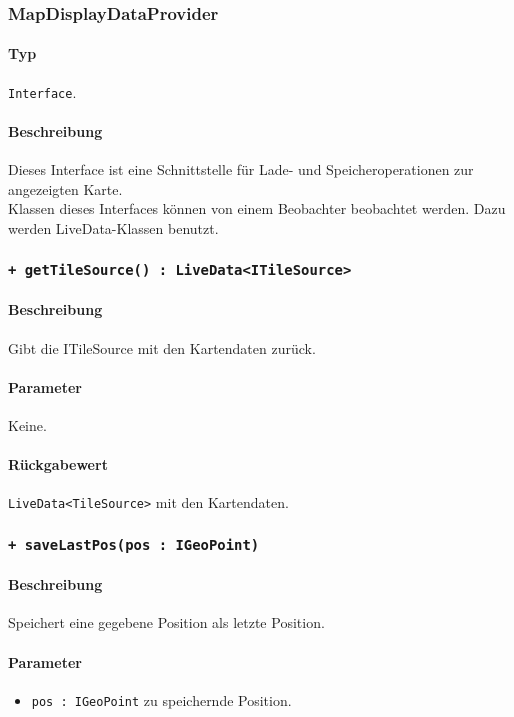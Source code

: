 \subsubsection{MapDisplayDataProvider}\label{App_Map_ViewModel_MapDisplayDataProvider}
\paragraph*{Typ}
\texttt{Interface}.
\paragraph*{Beschreibung}
Dieses Interface ist eine Schnittstelle für Lade- und Speicheroperationen zur angezeigten Karte.\\
Klassen dieses Interfaces können von einem Beobachter beobachtet werden. Dazu werden 
LiveData-Klassen benutzt.

\subsubsection*{\texttt{+ getTileSource() : LiveData<ITileSource>}}\label{App_Map_ViewModel_getTileSource}%
\paragraph*{Beschreibung}
Gibt die ITileSource mit den Kartendaten zurück.
\paragraph*{Parameter}
Keine.
\paragraph*{Rückgabewert}
\texttt{LiveData<TileSource>} mit den Kartendaten.

\subsubsection*{\texttt{+ saveLastPos(pos : IGeoPoint)}}\label{App_Map_ViewModel_saveLastPos}%
\paragraph*{Beschreibung}
Speichert eine gegebene Position als letzte Position.
\paragraph*{Parameter}
\begin{itemize}
    \item \texttt{pos : IGeoPoint} zu speichernde Position.
\end{itemize}

